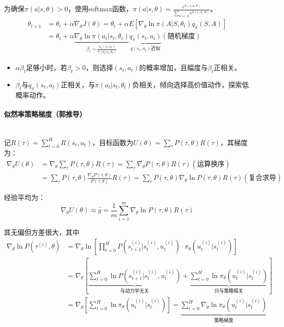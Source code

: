 \documentclass[
12pt, %
a4paper, 
oneside, %
headinclude,footinclude, %
]{scrartcl}
\begin{document}
为确保$ \pi(a|s, \theta) > 0 $，使用softmax函数，$ \pi(a|s, \theta) = \frac{e^{h(s, a, \theta)}}{\sum_{a' \in A} e^{h(s, a', \theta)}} $。
\begin{align*}
\theta_{t + 1} &= \theta_t + \alpha\nabla_\theta J(\theta) = \theta_t + \alpha E[\nabla_\theta \ln \pi(A|S, \theta_t) q_\pi(S, A)] \\
&= \theta_t + \alpha \underbrace{\nabla_\theta \ln \pi(a_t|s_t, \theta_t)}_{\beta_t = \frac{q_\pi(s_t, a_t)}{\pi(a_t|s_t, \theta_t)}} \underbrace{q_\pi(s_t, a_t)}_{q(s_t, a_t)\text{近似}} (\text{随机梯度})
\end{align*}    

\begin{itemize}
\item $ \alpha\beta_t $足够小时，若$ \beta_t > 0 $，则选择$ (s_t, a_t) $的概率增加，且幅度与$ \beta_t $正相关。
\item $ \beta_t $与$ q_{\pi}(s_t, a_t) $正相关，与$ \pi(a_t|s_t, \theta_t) $负相关，倾向选择高价值动作，探索低概率动作。
\end{itemize}
\paragraph{似然率策略梯度（郭推导）}~\\

记$ R(\tau) = \sum_{t = 0}^H R(s_t, u_t) $，目标函数为$ U(\theta) = \sum_{\tau} P(\tau, \theta) R(\tau) $，其梯度为：
\begin{align*}
\nabla_\theta U(\theta) &= \nabla_\theta \sum_{\tau} P(\tau, \theta) R(\tau) = \sum_{\tau} \nabla_\theta P(\tau, \theta) R(\tau) (\text{运算换序}) \\
&= \sum_{\tau} P(\tau, \theta) \frac{\nabla_\theta P(\tau, \theta)}{P(\tau, \theta)} R(\tau) = \sum_{\tau} P(\tau, \theta) \nabla_\theta \ln P(\tau, \theta) R(\tau) (\text{复合求导})
\end{align*}

经验平均为：
$$ \nabla_\theta U(\theta) \approx \hat{g} = \frac{1}{m} \sum_{i = 1}^m \nabla_\theta \ln P(\tau, \theta) R(\tau) $$

其无偏但方差很大，其中
\begin{align*}
\nabla_\theta\ln P(\tau^{(i)}, \theta) &= \nabla_\theta\ln[\prod_{t = 0}^{H} P(s_{t + 1}^{(i)}|s_t^{(i)}, u_t^{(i)}) \cdot \pi_\theta(u_t^{(i)}|s_t^{(i)})] \\
&= \nabla_\theta[\underbrace{\sum_{t = 0}^{H} \ln P(s_{t + 1}^{(i)}|s_t^{(i)}, u_t^{(i)})}_{\text{与动力学无关}} + \underbrace{\sum_{t = 0}^{H}\ln\pi_\theta(u_t^{(i)}|s_t^{(i)})}_{\text{只与策略相关}}] \\
&= \nabla_\theta[\sum_{t = 0}^{H} \ln\pi_\theta(u_t^{(i)}|s_t^{(i)})] = \underbrace{\sum_{t = 0}^{H} \nabla_\theta\ln\pi_\theta(u_t^{(i)}|s_t^{(i)})}_{\text{策略梯度}} 
\end{align*}
\end{document}
